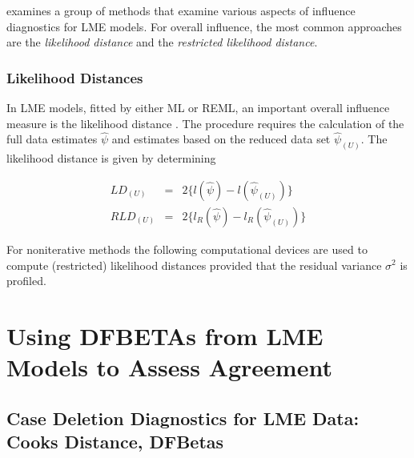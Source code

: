 \documentclass[12pt, a4paper]{report}
\theoremstyle{plain}
\theoremstyle{definition}
\theoremstyle{remark}
\begin{document}
	\citet{west} examines a group of methods that examine various aspects of influence diagnostics for LME models.
	For overall influence, the most common approaches are the \textit{likelihood distance} and the \textit{restricted likelihood distance}.
	
	
	
	
	
	

	
	
	
	\subsubsection{Likelihood Distances}
	
	In LME models, fitted by either ML or REML, an important overall
	influence measure is the likelihood distance \citep{cook82}. The
	procedure requires the calculation of the full data estimates
	$\hat{\psi}$ and estimates based on the reduced data set
	$\hat{\psi}_{(U)}$. The likelihood distance is given by
	determining
	
	
	\begin{eqnarray}
	LD_{(U)} &=& 2\{l(\hat{\psi}) - l( \hat{\psi}_{(U)}) \}\\
	RLD_{(U)} &=& 2\{l_{R}(\hat{\psi}) - l_{R}(\hat{\psi}_{(U)})\}
	\end{eqnarray}
	
	
	
	
	For noniterative methods the following computational devices are used to compute (restricted) likelihood distances provided that the residual variance
	$\sigma^2$ is profiled.
	
	
\section{Using DFBETAs from LME Models to Assess Agreement}
	

	
\subsection*{Case Deletion Diagnostics for LME Data: Cooks Distance, DFBetas}
\end{document}
